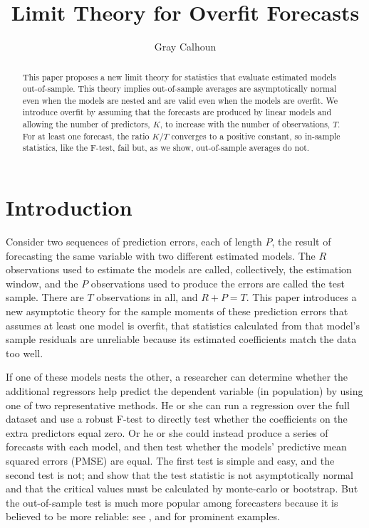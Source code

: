 \documentclass[11pt]{article} \def\baselinestretch{1.08}
\newcommand{\pp}[1]{#1} \newcommand{\intro}[1]{#1}
\newcommand{\context}{} \newcommand{\problem}{} \newcommand{\sowhat}{}
\begin{document}
\title{Limit Theory for Overfit Forecasts} \author{Gray Calhoun}
\maketitle

\begin{abstract}
This paper proposes a new limit theory for statistics that evaluate
estimated models out-of-sample.  This theory implies out-of-sample
averages are asymptotically normal even when the models are nested and
are valid even when the models are overfit.  We introduce overfit by
assuming that the forecasts are produced by 
linear models and allowing the number of predictors, $K$, to increase
with the number of observations, $T$.  For at least one forecast, the
ratio $K/T$ converges to a positive constant, so in-sample statistics,
like the F-test, fail but, as we show, out-of-sample averages do not.
\end{abstract}
\section{Introduction} 
\context 
\intro{Consider two sequences of prediction errors, each of
  length $P$, the result of forecasting the same variable with two
  different estimated models.  The $R$ observations used to estimate
  the models are called, collectively, the estimation window, and the
  $P$ observations used to produce the errors are called the test
  sample.  There are $T$ observations in all, and $R + P = T$.
  \pp{This paper introduces a new asymptotic theory for the sample
  moments of these prediction errors that assumes at least one model
  is overfit, that statistics calculated from that model's sample
  residuals are unreliable because its estimated coefficients match
  the data too well.}}

If one of these models nests the other, a researcher can determine
whether the additional regressors help predict the dependent variable
(in population) by using one of two representative methods.  He or she
can run a regression over the full dataset and use a robust F-test to
directly test whether the coefficients on the extra predictors equal
zero.  Or he or she could instead produce a series of forecasts with each
model, and then test whether the models' predictive mean squared errors
(PMSE) are equal.  The first test is simple and easy, and the second
test is not;  and
 show that the test statistic 
is not asymptotically normal and that the critical values must be
calculated by monte-carlo or bootstrap.  But the out-of-sample test
is much more popular among forecasters because it is believed to be
more reliable: see ,
 and
 for prominent examples. 
\end{document}
